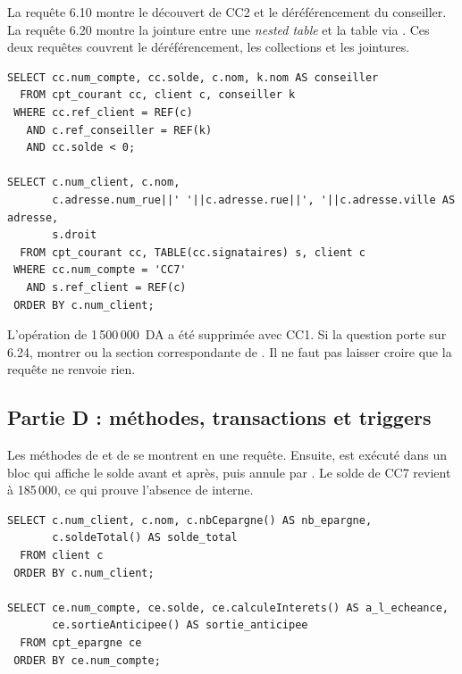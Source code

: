 La requête 6.10 montre le découvert de CC2 et le déréférencement du conseiller.
La requête 6.20 montre la jointure entre une \emph{nested table} et la table
 via . Ces deux requêtes couvrent le
déréférencement, les collections et les jointures.

\begin{lstlisting}[caption={Requêtes 6.10 et 6.20 en démonstration.},label={lst:demo-c}]
SELECT cc.num_compte, cc.solde, c.nom, k.nom AS conseiller
  FROM cpt_courant cc, client c, conseiller k
 WHERE cc.ref_client = REF(c)
   AND c.ref_conseiller = REF(k)
   AND cc.solde < 0;

SELECT c.num_client, c.nom,
       c.adresse.num_rue||' '||c.adresse.rue||', '||c.adresse.ville AS adresse,
       s.droit
  FROM cpt_courant cc, TABLE(cc.signataires) s, client c
 WHERE cc.num_compte = 'CC7'
   AND s.ref_client = REF(c)
 ORDER BY c.num_client;
\end{lstlisting}

\begin{attentionbox}
L'opération de 1\,500\,000~DA a été supprimée avec CC1. Si la question porte
sur 6.24, montrer  ou la section correspondante de
. Il ne faut pas laisser croire que la requête ne renvoie
rien.
\end{attentionbox}

\subsection{Partie D : méthodes, transactions et triggers}

Les méthodes de  et de  se montrent en une
requête. Ensuite,  est exécuté dans un bloc qui affiche le solde
avant et après, puis annule par . Le solde de CC7 revient à
185\,000, ce qui prouve l'absence de  interne.

\begin{lstlisting}[caption={Méthodes de client et d'épargne.},label={lst:demo-methodes}]
SELECT c.num_client, c.nom, c.nbCepargne() AS nb_epargne,
       c.soldeTotal() AS solde_total
  FROM client c
 ORDER BY c.num_client;

SELECT ce.num_compte, ce.solde, ce.calculeInterets() AS a_l_echeance,
       ce.sortieAnticipee() AS sortie_anticipee
  FROM cpt_epargne ce
 ORDER BY ce.num_compte;
\end{lstlisting}

